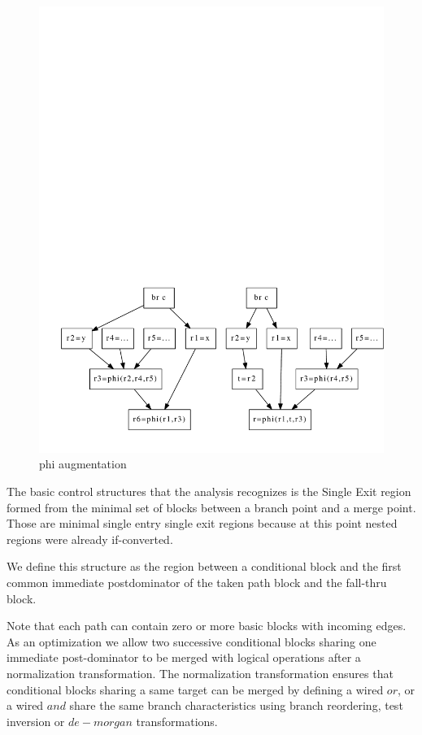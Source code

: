 \begin{figure}
\begin{minipage}[t]{5cm}
\includegraphics[scale=0.4]{phi_augmentation.pdf}
\caption{phi augmentation}
\label{fig:phi_aug}
\end{minipage}
\label{fig: phi_operations}
\end{figure}

The basic control structures that the analysis recognizes is the Single Exit region formed from the minimal set of blocks between a branch point and a merge point.  Those are minimal single entry single exit regions because at this point nested regions were already if-converted.

 We define this structure as the region between a conditional block and the first common immediate postdominator of the taken path block and the fall-thru block.

Note that each path can contain zero or more basic blocks with incoming edges.
As an optimization we allow two successive conditional blocks sharing one immediate post-dominator to be merged with logical operations after a normalization transformation. The normalization transformation ensures that conditional blocks sharing a same target can be merged by defining a wired $or$, or a wired $and$ share the same branch characteristics using branch reordering, test inversion or $de-morgan$ transformations.

